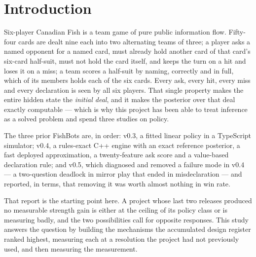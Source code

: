 \section{Introduction}
\label{sec:intro}

Six-player Canadian Fish is a team game of pure public information flow. Fifty-four cards are dealt
nine each into two alternating teams of three; a player asks a named opponent for a named card,
must already hold another card of that card's six-card half-suit, must not hold the card itself, and
keeps the turn on a hit and loses it on a miss; a team scores a half-suit by naming, correctly and
in full, which of its members holds each of the six cards. Every ask, every hit, every miss and
every declaration is seen by all six players. That single property makes the entire hidden state the
\emph{initial deal}, and it makes the posterior over that deal exactly computable --- which is why
this project has been able to treat inference as a solved problem and spend three studies on policy.

The three prior FishBots are, in order: v0.3, a fitted linear policy in a TypeScript simulator;
v0.4, a rules-exact C++ engine with an exact reference posterior, a fast deployed approximation, a
twenty-feature ask score and a value-based declaration rule; and v0.5, which diagnosed and removed a
failure mode in v0.4 --- a two-question deadlock in mirror play that ended in misdeclaration --- and
reported, in terms, that removing it was worth almost nothing in win rate.

That report is the starting point here. A project whose last two releases produced no measurable
strength gain is either at the ceiling of its policy class or is measuring badly, and the two
possibilities call for opposite responses. This study answers the question by building the
mechanisms the accumulated design register ranked highest, measuring each at a resolution the
project had not previously used, and then measuring the measurement.

